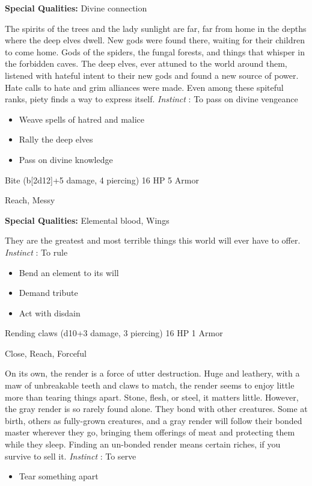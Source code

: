  \textbf{Special Qualities:}
 Divine connection


 The spirits of the trees and the lady sunlight are far, far from home in the depths where the deep elves dwell. New gods were found there, waiting for their children to come home. Gods of the spiders, the fungal forests, and things that whisper in the forbidden caves. The deep elves, ever attuned to the world around them, listened with hateful intent to their new gods and found a new source of power. Hate calls to hate and grim alliances were made. Even among these spiteful ranks, piety finds a way to express itself. \emph{Instinct}
: To pass on divine vengeance
\begin{itemize}
\item Weave spells of hatred and malice
\item Rally the deep elves
\item Pass on divine knowledge

\end{itemize}




 Bite (b[2d12]+5 damage, 4 piercing) 16 HP 5 Armor


 Reach, Messy


 \textbf{Special Qualities:}
 Elemental blood, Wings


 They are the greatest and most terrible things this world will ever have to offer. \emph{Instinct}
: To rule
\begin{itemize}
\item Bend an element to its will
\item Demand tribute
\item Act with disdain

\end{itemize}




 Rending claws (d10+3 damage, 3 piercing) 16 HP 1 Armor


 Close, Reach, Forceful


 On its own, the render is a force of utter destruction. Huge and leathery, with a maw of unbreakable teeth and claws to match, the render seems to enjoy little more than tearing things apart. Stone, flesh, or steel, it matters little. However, the gray render is so rarely found alone. They bond with other creatures. Some at birth, others as fully-grown creatures, and a gray render will follow their bonded master wherever they go, bringing them offerings of meat and protecting them while they sleep. Finding an un-bonded render means certain riches, if you survive to sell it. \emph{Instinct}
: To serve
\begin{itemize}
\item Tear something apart

\end{itemize}


